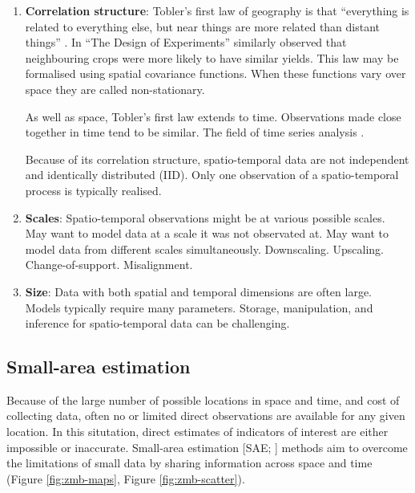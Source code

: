 \documentclass[a4paper, nobind]{templates/ociamthesis}
\begin{document}
\begin{enumerate}
\def\labelenumi{\arabic{enumi}.}
\item
  \textbf{Correlation structure}:
  Tobler's first law of geography is that ``everything is related to everything else, but near things are more related than distant things'' \autocite{tobler1970computer}.
  In ``The Design of Experiments'' \textcite{fisher1936design} similarly observed that neighbouring crops were more likely to have similar yields.
  This law may be formalised using spatial covariance functions.
  When these functions vary over space they are called non-stationary.

  As well as space, Tobler's first law extends to time.
  Observations made close together in time tend to be similar.
  The field of time series analysis \autocite{hyndman2018forecasting}.

  Because of its correlation structure, spatio-temporal data are not independent and identically distributed (IID).
  Only one observation of a spatio-temporal process is typically realised.
\item
  \textbf{Scales}:
  Spatio-temporal observations might be at various possible scales.
  May want to model data at a scale it was not observated at.
  May want to model data from different scales simultaneously.
  Downscaling.
  Upscaling.
  Change-of-support.
  Misalignment.
\item
  \textbf{Size}:
  Data with both spatial and temporal dimensions are often large.
  Models typically require many parameters.
  Storage, manipulation, and inference for spatio-temporal data can be challenging.
\end{enumerate}

\hypertarget{small-area-estimation}{%
\subsection{Small-area estimation}\label{small-area-estimation}}

Because of the large number of possible locations in space and time, and cost of collecting data, often no or limited direct observations are available for any given location.
In this situtation, direct estimates of indicators of interest are either impossible or inaccurate.
Small-area estimation {[}SAE; \textcite{pfeffermann2013new}{]} methods aim to overcome the limitations of small data by sharing information across space and time (Figure \ref{fig:zmb-maps}, Figure \ref{fig:zmb-scatter}).
\end{document}
